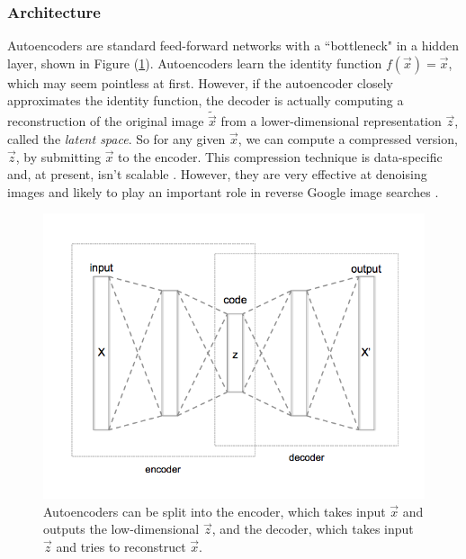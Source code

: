 \documentclass[12pt,twoside]{article}
\begin{document}
\subsubsection{Architecture}

Autoencoders are standard feed-forward networks with a ``bottleneck" in a hidden layer, shown in Figure (\ref{fig:autoencoder_encoder_decoder}). Autoencoders learn the identity function $f(\vec{x})=\vec{x}$, which may seem pointless at first. However, if the autoencoder closely approximates the identity function, the decoder is actually computing a reconstruction of the original image $\widetilde{\vec{x}}$ from a lower-dimensional representation $\vec{z}$, called the \textit{latent space}. So for any given $\vec{x}$, we can compute a compressed version, $\vec{z}$, by submitting $\vec{x}$ to the encoder. This compression technique is data-specific and, at present, isn't scalable \cite{Chollet2016}. However, they are very effective at denoising images and likely to play an important role in reverse Google image searches \cite{Krizhevsky2011}.

\begin{figure}
\includegraphics[scale=0.5]{figures/autoencoder_encoder_decoder.png}
\centering
\captionsetup{justification=centering}
\caption{Autoencoders can be split into the encoder, which takes input $\vec{x}$ and outputs the low-dimensional $\vec{z}$, and the decoder, which takes input $\vec{z}$ and tries to reconstruct $\vec{x}$.}
\label{fig:autoencoder_encoder_decoder}
\end{figure}
\end{document}

